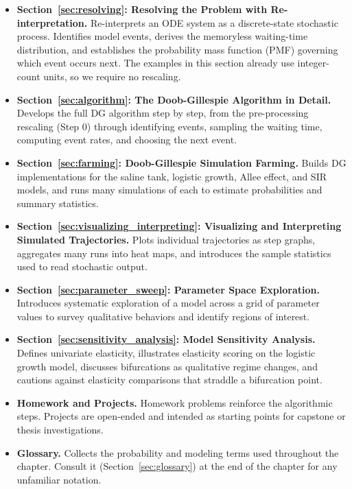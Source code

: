 \begin{itemize}
\item \textbf{Section~\ref{sec:resolving}: Resolving the Problem with Re-interpretation.} Re-interprets an ODE system as a discrete-state stochastic process. Identifies model events, derives the memoryless waiting-time distribution, and establishes the probability mass function (PMF) governing which event occurs next. The examples in this section already use integer-count units, so we require no rescaling.

\item \textbf{Section~\ref{sec:algorithm}: The Doob-Gillespie Algorithm in Detail.} Develops the full DG algorithm step by step, from the pre-processing rescaling (Step 0) through identifying events, sampling the waiting time, computing event rates, and choosing the next event.

\item \textbf{Section~\ref{sec:farming}: Doob-Gillespie Simulation Farming.} Builds DG implementations for the saline tank, logistic growth, Allee effect, and SIR models, and runs many simulations of each to estimate probabilities and summary statistics.

\item \textbf{Section~\ref{sec:visualizing_interpreting}: Visualizing and Interpreting Simulated Trajectories.} Plots individual trajectories as step graphs, aggregates many runs into heat maps, and introduces the sample statistics used to read stochastic output.

\item \textbf{Section~\ref{sec:parameter_sweep}: Parameter Space Exploration.} Introduces systematic exploration of a model across a grid of parameter values to survey qualitative behaviors and identify regions of interest.

\item \textbf{Section~\ref{sec:sensitivity_analysis}: Model Sensitivity Analysis.} Defines univariate elasticity, illustrates elasticity scoring on the logistic growth model, discusses bifurcations as qualitative regime changes, and cautions against elasticity comparisons that straddle a bifurcation point.

\item \textbf{Homework and Projects.} Homework problems reinforce the algorithmic steps. Projects are open-ended and intended as starting points for capstone or thesis investigations.

\item \textbf{Glossary.} Collects the probability and modeling terms used throughout the chapter. Consult it (Section~\ref{sec:glossary}) at the end of the chapter for any unfamiliar notation.
\end{itemize}


